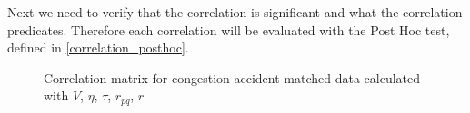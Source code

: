 Next we need to verify that the correlation is significant and what the correlation predicates. Therefore each correlation will be evaluated with the Post Hoc test, defined in \cref{correlation_posthoc}. 
\begin{figure}[!ht]
	\centering
	\caption{Correlation matrix for congestion-accident matched data calculated with $V$, $\eta$, $\tau$, $r_{pq}$, $r$}
	\label{img:correlation_matrix_matched_cramers}
\end{figure}

\label{ana:baysis_matched_Str}

